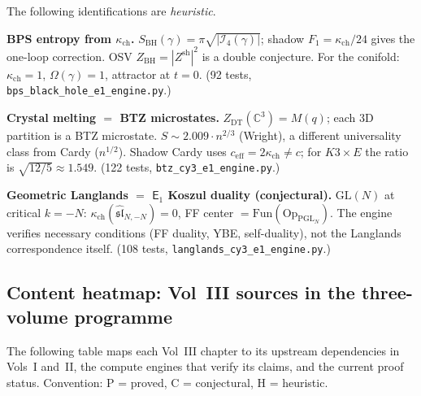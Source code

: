 \documentclass[11pt]{article}
\newcommand{\C}{\mathbb{C}}
\newcommand{\Eone}{\mathsf{E}_1}
\newcommand{\DT}{\mathrm{DT}}
\begin{document}
The following identifications are \emph{heuristic}.

\medskip
\noindent\textbf{BPS entropy from $\kappa_{\mathrm{ch}}$.}
$S_{\mathrm{BH}}(\gamma) = \pi\sqrt{|\mathcal{I}_4(\gamma)|}$;
shadow $F_1 = \kappa_{\mathrm{ch}}/24$ gives the one-loop correction.
OSV $Z_{\mathrm{BH}} = |Z^{\mathrm{sh}}|^2$ is a double conjecture.
For the conifold: $\kappa_{\mathrm{ch}} = 1$, $\Omega(\gamma) = 1$, attractor at $t = 0$.
(92 tests, \texttt{bps\_black\_hole\_e1\_engine.py}.)

\medskip
\noindent\textbf{Crystal melting $=$ BTZ microstates.}
$Z_{\DT}(\C^3) = M(q)$; each $3$D partition is a BTZ microstate.
$S \sim 2.009 \cdot n^{2/3}$ (Wright), a different universality class from Cardy ($n^{1/2}$).
Shadow Cardy uses $c_{\mathrm{eff}} = 2\kappa_{\mathrm{ch}} \neq c$; for $K3 \times E$
the ratio is $\sqrt{12/5} \approx 1.549$.
(122 tests, \texttt{btz\_cy3\_e1\_engine.py}.)

\medskip
\noindent\textbf{Geometric Langlands $=$ $\Eone$ Koszul duality (conjectural).}
$\mathrm{GL}(N)$ at critical $k = -N$: $\kappa_{\mathrm{ch}}(\widehat{\mathfrak{sl}}_{N,-N}) = 0$,
FF center $= \mathrm{Fun}(\mathrm{Op}_{\mathrm{PGL}_N})$.
The engine verifies necessary conditions (FF duality, YBE, self-duality), not the
Langlands correspondence itself.
(108 tests, \texttt{langlands\_cy3\_e1\_engine.py}.)


\subsection{Content heatmap: Vol~III sources in the three-volume programme}
\label{subsec:content-heatmap}

The following table maps each Vol~III chapter to its upstream dependencies
in Vols~I and~II, the compute engines that verify its claims, and the
current proof status. Convention: \textsc{P} = proved, \textsc{C} = conjectural,
\textsc{H} = heuristic.
\end{document}
